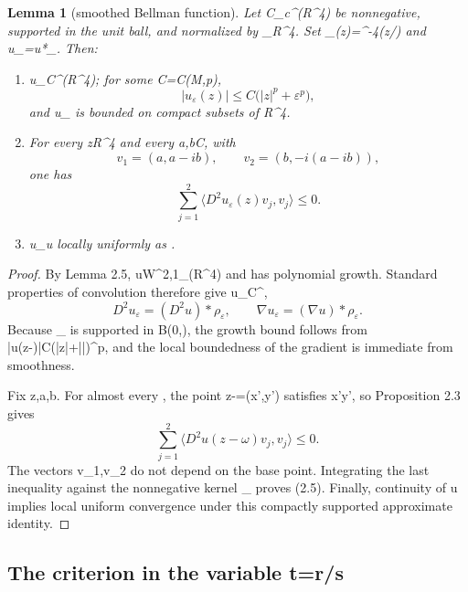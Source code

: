 \documentclass[10pt,reqno]{amsart}
\def\({}\def\){}%
\newtheorem{lemma}[theorem]{Lemma}
\theoremstyle{definition}
\theoremstyle{remark}
\begin{document}
\begin{lemma}[smoothed Bellman function]\label{lem:2-6}
Let \(\rho\in C_c^\infty(\mathbb R^4)\) be nonnegative, supported in the unit
ball, and normalized by \(\int_{\mathbb R^4}\).  Set
\(\rho_\varepsilon(z)=\varepsilon^{-4}\rho(z/\varepsilon)\) and
\(u_\varepsilon=u*\rho_\varepsilon\).  Then:

\begin{enumerate}
\def\labelenumi{\arabic{enumi}.}
\item
  \(u_\varepsilon\in C^\infty(\mathbb R^4)\); for some \(C=C(M,p)\),
  \[|u_\varepsilon(z)|\le C\bigl(|z|^p+\varepsilon^p\bigr),\]
  and \(\nabla u_\varepsilon\) is bounded on compact subsets of \(\mathbb R^4\).
\item
  For every \(z\in\mathbb R^4\) and every \(a,b\in\mathbb C\), with
  \[v_1=(a,a-ib),\qquad v_2=(b,-i(a-ib)),\]
  one has
  \[\sum_{j=1}^2\big\langle D^2u_\varepsilon(z)v_j,v_j\big\rangle\le0. \tag{2.5}\]
\item
  \(u_\varepsilon\to u\) locally uniformly as \(\varepsilon{}\).
\end{enumerate}
\end{lemma}

\begin{proof}
By Lemma 2.5, \(u\in W^{2,1}_{}(\mathbb R^4)\) and has polynomial
growth.  Standard properties of convolution therefore give
\(u_\varepsilon\in C^\infty\),
\[D^2u_\varepsilon=(D^2u)*\rho_\varepsilon,
\qquad \nabla u_\varepsilon=(\nabla u)*\rho_\varepsilon.\]
Because \(\rho_\varepsilon\) is supported in \(B(0,\varepsilon)\), the growth
bound follows from
\(|u(z-\omega)|\le C(|z|+|\omega|)^p\), and the local boundedness of the
gradient is immediate from smoothness.

Fix \(z,a,b\).  For almost every \(\omega\), the point \(z-\omega=(x',y')\)
satisfies \(x'\ne y'\), so Proposition 2.3 gives
\[\sum_{j=1}^2
  \big\langle D^2u(z-\omega)v_j,v_j\big\rangle\le0.\]
The vectors \(v_1,v_2\) do not depend on the base point.  Integrating the last
inequality against the nonnegative kernel \(\rho_\varepsilon\) proves (2.5).
Finally, continuity of \(u\) implies local uniform convergence under this
compactly supported approximate identity.
\end{proof}

\subsection{The criterion in the variable \(t=r/s\)}\label{subsec:profile-criterion}
\end{document}
